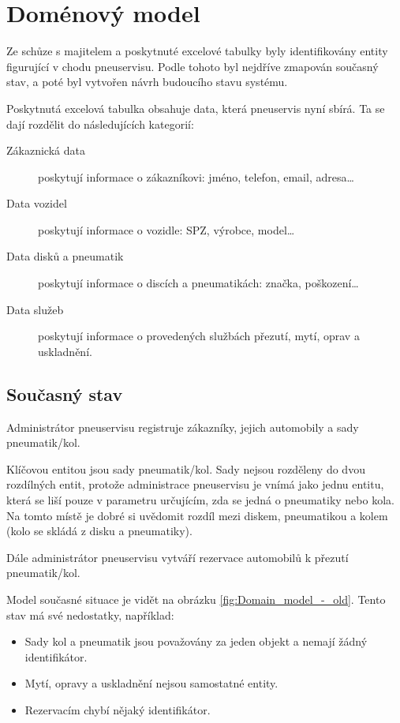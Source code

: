 \section{Doménový model}
Ze schůze s majitelem a poskytnuté excelové tabulky byly identifikovány entity figurující v chodu pneuservisu. Podle tohoto byl nejdříve zmapován současný stav, a poté byl vytvořen návrh budoucího stavu systému.

Poskytnutá excelová tabulka obsahuje data, která pneuservis nyní sbírá. Ta se dají rozdělit do následujících kategorií:
\begin{description}
    \item [Zákaznická data] poskytují informace o zákazníkovi: jméno, telefon, email, adresa\dots
    \item [Data vozidel] poskytují informace o vozidle: SPZ, výrobce, model\dots
    \item [Data disků a pneumatik] poskytují informace o discích a pneumatikách: značka, poškození\dots
    \item [Data služeb] poskytují informace o provedených službách přezutí, mytí, oprav a uskladnění.
\end{description}
\subsection{Současný stav}
Administrátor pneuservisu registruje zákazníky, jejich automobily a sady pneumatik/kol.

Klíčovou entitou jsou sady pneumatik/kol. Sady nejsou rozděleny do dvou rozdílných entit, protože administrace pneuservisu je vnímá jako jednu entitu, která se liší pouze v parametru určujícím, zda se jedná o pneumatiky nebo kola. Na tomto místě je dobré si uvědomit rozdíl mezi diskem, pneumatikou a kolem (kolo se skládá z disku a pneumatiky).

Dále administrátor pneuservisu vytváří rezervace automobilů k přezutí pneumatik/kol. 

Model současné situace je vidět na obrázku \ref{fig:Domain_model_-_old}. Tento stav má své nedostatky, například: 
\begin{itemize}
    \item Sady kol a pneumatik jsou považovány za jeden objekt a nemají žádný identifikátor. 
    \item Mytí, opravy a uskladnění nejsou samostatné entity. 
    \item Rezervacím chybí nějaký identifikátor.
\end{itemize}

